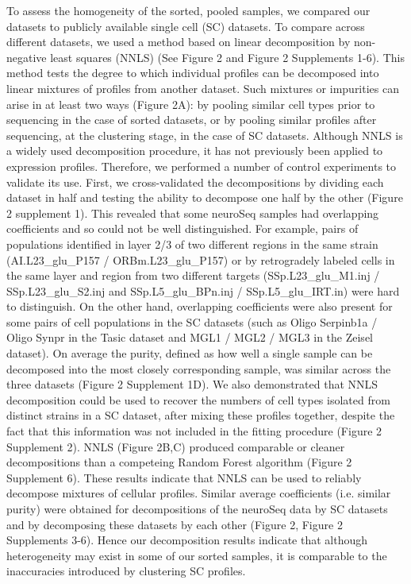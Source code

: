 To assess the homogeneity of the sorted, pooled samples, we compared our datasets to publicly available single cell (SC) datasets. To compare across different datasets, we used a method based on linear decomposition by non-negative least squares (NNLS) (See Figure 2 and Figure 2 Supplements 1-6). This method tests the degree to which individual profiles can be decomposed into linear mixtures of profiles from another dataset. Such mixtures or impurities can arise in at least two ways (Figure 2A): by pooling similar cell types prior to sequencing in the case of sorted datasets, or by pooling similar profiles after sequencing, at the clustering stage, in the case of SC datasets. Although NNLS is a widely used decomposition procedure, it has not previously been applied to expression profiles. Therefore, we performed a number of control experiments to validate its use. First, we cross-validated the decompositions by dividing each dataset in half and testing the ability to decompose one half by the other (Figure 2 supplement 1). This revealed that some neuroSeq samples had overlapping coefficients and so could not be well distinguished. For example, pairs of populations identified in layer 2/3 of two different regions in the same strain (AI.L23\_glu\_P157 / ORBm.L23\_glu\_P157) or by retrogradely labeled cells in the same layer and region from two different targets (SSp.L23\_glu\_M1.inj / SSp.L23\_glu\_S2.inj and SSp.L5\_glu\_BPn.inj / SSp.L5\_glu\_IRT.in) were hard to distinguish. On the other hand, overlapping coefficients were also present for some pairs of cell populations in the SC datasets (such as Oligo Serpinb1a / Oligo Synpr in the Tasic dataset and MGL1 / MGL2 / MGL3 in the Zeisel dataset). On average the purity, defined as how well a single sample can be decomposed into the most closely corresponding sample, was similar across the three datasets (Figure 2 Supplement 1D). We also demonstrated that NNLS decomposition could be used to recover the numbers of cell types isolated from distinct strains in a SC dataset, after mixing these profiles together, despite the fact that this information was not included in the fitting procedure (Figure 2 Supplement 2). NNLS (Figure 2B,C) produced comparable or cleaner decompositions than a competeing Random Forest algorithm (Figure 2 Supplement 6). These results indicate that NNLS can be used to reliably decompose mixtures of cellular profiles. Similar average coefficients (i.e. similar purity) were obtained for decompositions of the neuroSeq data by SC datasets and by decomposing these datasets by each other (Figure 2, Figure 2 Supplements 3-6). Hence our decomposition results indicate that although heterogeneity may exist in some of our sorted samples, it is comparable to the inaccuracies introduced by clustering SC profiles.

